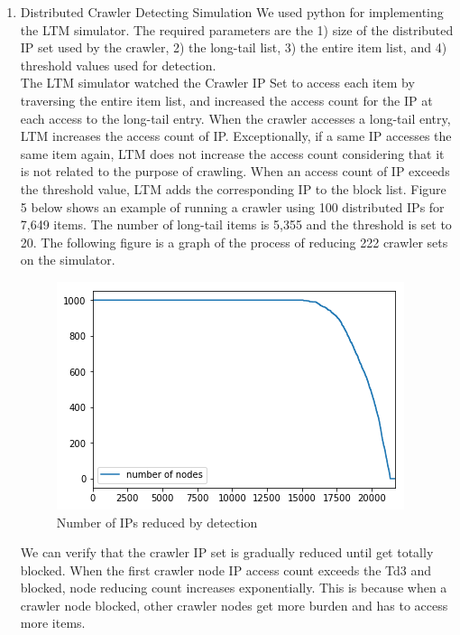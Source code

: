 \documentclass[sigconf,anonymous=true]{acmart}
\begin{document}
\begin{enumerate}
\item Distributed Crawler Detecting Simulation
\newline 
We used python for implementing the LTM simulator. The required parameters are the 1) size of the distributed IP set used by the crawler, 2) the long-tail list, 3) the entire item list, and 4) threshold values used for detection.\\
The LTM simulator watched the Crawler IP Set to access each item by traversing the entire item list, and increased the access count for the IP at each access to the long-tail entry.
When the crawler accesses a long-tail entry, LTM increases the access count of IP. Exceptionally, if a same IP accesses the same item again, LTM does not increase the access count considering that it is not related to the purpose of crawling. When an access count of IP exceeds the threshold value, LTM adds the corresponding IP to the block list. Figure 5 below shows an example of running a crawler using 100 distributed IPs for 7,649 items. The number of long-tail items is 5,355 and the threshold is set to 20. The following figure is a graph of the process of reducing 222 crawler sets on the simulator. \\

\begin{figure}[H]
    \centering
    \includegraphics[width=0.7\columnwidth]{figs/figure_06_nr.png}
    \caption{Number of IPs reduced by detection}
    \label{fig:my_label}
\end{figure}


We can verify that the crawler IP set is gradually reduced until get totally blocked. When the first crawler node IP access count exceeds the Td3 and blocked, node reducing count increases exponentially. This is because when a crawler node blocked, other crawler nodes get more burden and has to access more items.
\newline


\end{enumerate}
\end{document}
